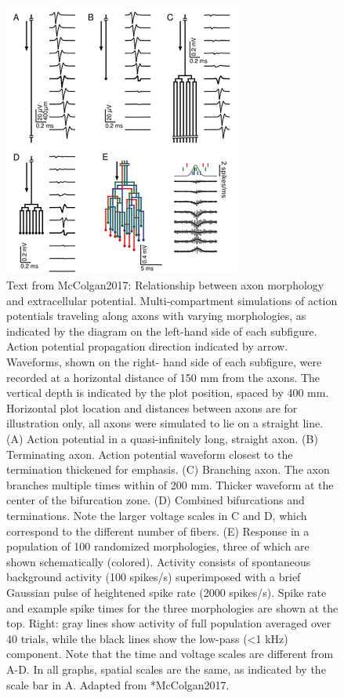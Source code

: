 \begin{figure}[!ht]
\begin{center}
\includegraphics[width=0.7\textwidth]{Figures/Spikes/Spikes-AxonalSpikes-w100-r150}
\end{center}
\caption[]{
Text from McColgan2017: Relationship between axon morphology and extracellular potential. Multi-compartment simulations of action potentials traveling along axons with varying morphologies, as indicated by the diagram on the left-hand side of each subfigure. Action potential propagation direction indicated by arrow. Waveforms, shown on the right- hand side of each subfigure, were recorded at a horizontal distance of 150 mm from the axons. The vertical depth is indicated by the plot position, spaced by 400 mm. Horizontal plot location and distances between axons are for illustration only, all axons were simulated to lie on a straight line. (A) Action potential in a quasi-infinitely long, straight axon. (B) Terminating axon. Action potential waveform closest to the termination thickened for emphasis. (C) Branching axon. The axon branches multiple times within of 200 mm. Thicker waveform at the center of the bifurcation zone. (D) Combined bifurcations and terminations. Note the larger voltage scales in C and D, which correspond to the different number of fibers. (E) Response in a population of 100 randomized morphologies, three of which are shown schematically (colored). Activity consists of spontaneous background activity (100 spikes/s) superimposed with a brief Gaussian pulse of heightened spike rate (2000 spikes/s). Spike rate and example spike times for the three morphologies are shown at the top. Right: gray lines show activity of full population averaged over 40 trials, while the black lines show the low-pass (<1 kHz) component. Note that the time and voltage scales are different from A-D. In all graphs, spatial scales are the same, as indicated by the scale bar in A. 
 Adapted from \citeasnoun**{McColgan2017}.
}
\label{fig:Spikes:AxonalSpikes}
\end{figure}
%




